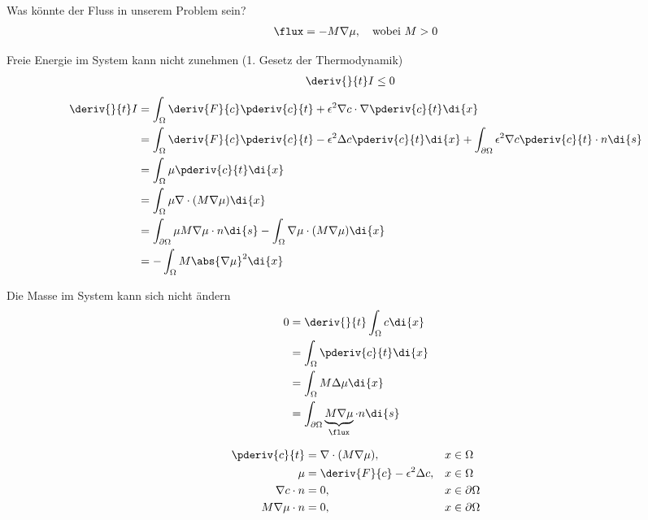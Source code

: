 Was könnte der Fluss in unserem Problem sein?
\begin{align*}
\flux
=
- M \nabla \mu
,\quad \text{wobei } M > 0
\end{align*}

Freie Energie im System kann nicht zunehmen (1. Gesetz der Thermodynamik)
\begin{align*}
\deriv{}{t} I
&\leq
0
\end{align*}
\begin{align*}
\deriv{}{t} I
&=
\int_\Omega \deriv{F}{c} \pderiv{c}{t} + \epsilon^2 \nabla c \cdot \nabla \pderiv{c}{t} \di{x}
\\
&=
\int_\Omega \deriv{F}{c} \pderiv{c}{t} - \epsilon^2 \Delta c \pderiv{c}{t} \di{x}
+ \int_{\partial\Omega} \epsilon^2 \nabla c \pderiv{c}{t} \cdot n \di{s}
\\
&=
\int_\Omega \mu \pderiv{c}{t} \di{x}
\\
&=
\int_\Omega \mu \nabla \cdot (M \nabla \mu) \di{x}
\\
&=
\int_{\partial\Omega} \mu M \nabla \mu \cdot n \di{s} - \int_\Omega \nabla \mu \cdot (M \nabla \mu) \di{x}
\\
&=
-\int_\Omega M \abs{\nabla \mu}^2 \di{x}
\end{align*}

Die Masse im System kann sich nicht ändern
\begin{align*}
0
&=
\deriv{}{t} \int_\Omega c \di{x}
\\
&=
\int_\Omega \pderiv{c}{t} \di{x}
\\
&=
\int_\Omega M \Delta \mu \di{x}
\\
&=
\int_{\partial\Omega} \underbrace{M \nabla \mu}_\flux \cdot n \di{s}
\end{align*}


\begin{align}
\begin{aligned}
\pderiv{c}{t}
&=
\nabla \cdot (M \nabla \mu)
,\quad&
x &\in \Omega
\\
\mu
&=
\deriv{F}{c} -  \epsilon^2 \Delta c
,&
x &\in \Omega
\\
\nabla c \cdot n
&=
0
,&
x &\in \partial\Omega
\\
M \nabla \mu \cdot n
&=
0
,&
x &\in \partial\Omega
\end{aligned}
\label{cahnhilliard:cheq}
\end{align}
